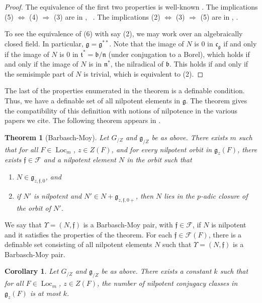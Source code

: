 \documentclass[12pt]{amsart}
\newcommand{\op}[1]{\operatorname{#1}}
\def\Y{\Upsilon}
\def\s{{\mathfrak{f}}}
\newcommand{\cF}{\mathcal{F}}
\newcommand{\fg}{\mathfrak{g}}
\newcommand{\fb}{\mathfrak{b}}
\newcommand{\fn}{\mathfrak{n}}
\newcommand{\fc}{\mathfrak{c}}
\newcommand{\ft}{\mathfrak{t}}
\theoremstyle{plain}
\newtheorem{theorem}[thm]{Theorem}
\newtheorem{cor}[thm]{Corollary}
\theoremstyle{definition}
\begin{document}
\begin{proof} The equivalence of the first two properties is
  well-known \cite[15.3]{humphreys1975linear}.  The implications (5)
  $\Leftrightarrow$ (4) $\Rightarrow$ (3) are in \cite{debacker:nilp},
  ~\cite[2.5.1]{adler-debacker:bt-lie}.  The implications (2)
  $\Leftrightarrow$ (3) $\Rightarrow$ (5) are in \cite[3.5]{mcninch},
  \cite[4.1,Prop 4]{mcninch}.

  To see the equivalence of (6) with say (2), we may work over an
  algebraically closed field. In particular, $\fg = \fg^{**}$.  Note
  that the image of $N$ is $0$ in $\fc_{\fg}$ if and only if the image
  of $N$ is $0$ in $\ft^* = \fb/\fn$ (under conjugation to a Borel),
  which holds if and only if the image of $N$ is in $\fn^*$, the
  nilradical of $\fb$.  This holds if and only if the semisimple part
  of $N$ is trivial, which is equivalent to (2).
\end{proof}

The last of the properties enumerated in the theorem is a definable
condition.  Thus, we have a definable set of all nilpotent elements in
$\fg$.  The theorem gives the compatibility of this definition with
notions of nilpotence in the various papers we cite.  The following
theorem appears in \cite{barbasch-moy}.

\begin{theorem}[Barbasch-Moy]\label{thm:bm} 
  Let $G_{/Z}$ and $\fg_{/Z}$ be as above.  There exists $m$ such that
  for all $F\in \op{Loc}_m$, $z\in Z(F)$, and for every nilpotent
  orbit in $\fg_z(F)$, there exists $\s\in \cF$ and a nilpotent
  element $N$ in the orbit such that
\begin{enumerate}
   \item $N\in \fg_{z,\s,0}$, and
   \item if $N'$ is nilpotent and $N'\in N + \fg_{z,\s,0+}$, then $N$
     lies in the $p$-adic closure of the orbit of $N'$.
\end{enumerate}
\end{theorem}

We say that $\Y=(N,\s)$ is a Barbasch-Moy pair, with $\s\in \cF$, if $N$
is nilpotent and it satisfies the properties of the theorem.  For each
$\s\in \cF(F)$, there is a definable set consisting of all nilpotent
elements $N$ such that $\Y=(N,\s)$ is a
Barbasch-Moy pair.

\begin{cor}\label{thm:nilbound}  Let $G_{/Z}$ and $\fg_{/Z}$ be as above.  
There exists a constant $k$ such that for all $F\in \op{Loc}_m$, $z\in
Z(F)$, the number of nilpotent conjugacy classes in $\fg_z(F)$ is at
most $k$.
\end{cor}
\end{document}
